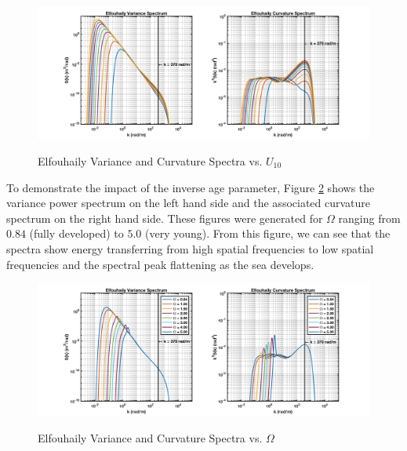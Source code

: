 \begin{figure}[ht]
  \begin{center}
\includegraphics[width=6in]{../media/Ocean_Surface/elf_variance_curvature_spectrum.png}
  \end{center}
  \renewcommand{\baselinestretch}{1} \small\normalsize
  \begin{quote}
    \caption[Elfouhaily Variance and Curvature Spectra vs. $U_{10}$]{Elfouhaily Variance and Curvature Spectra vs. $U_{10}$\label{os_fig:3}}
  \end{quote}
\end{figure}
\renewcommand{\baselinestretch}{2} \small\normalsize

To demonstrate the impact of the inverse age parameter, Figure \ref{os_fig:3a} shows the variance power spectrum on the left hand side and the associated curvature spectrum on the right hand side. These figures were generated for $\Omega$ ranging from $0.84$ (fully developed) to $5.0$ (very young). From this figure, we can see that the spectra show energy transferring from high spatial frequencies to low spatial frequencies and the spectral peak flattening as the sea develops.

\begin{figure}[ht]
  \begin{center}
\includegraphics[width=6in]{../media/Ocean_Surface/elf_variance_curvature_spectrum_age.png}
  \end{center}
  \renewcommand{\baselinestretch}{1} \small\normalsize
  \begin{quote}
    \caption[Elfouhaily Variance and Curvature Spectra vs. $\Omega$]{Elfouhaily Variance and Curvature Spectra vs. $\Omega$ \label{os_fig:3a}}
  \end{quote}
\end{figure}
\renewcommand{\baselinestretch}{2} \small\normalsize


